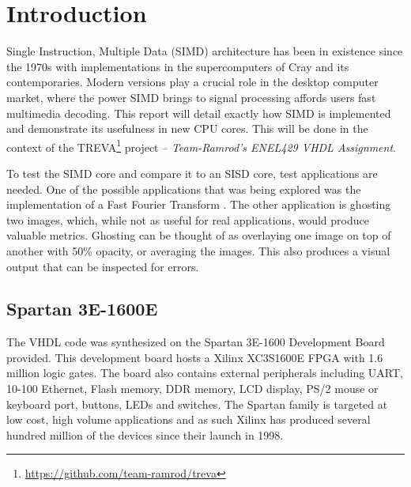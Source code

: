 \section{Introduction}

 Single Instruction, Multiple Data (SIMD) architecture has been in 
existence since the 1970s with implementations in the supercomputers of Cray 
and its contemporaries. Modern versions play a crucial role in the 
desktop computer market, where the power SIMD brings to signal
processing affords users fast multimedia decoding\cite{bonnot2008definition}. This
report will detail exactly how SIMD is implemented and demonstrate its usefulness
in new CPU cores.  This will be done in the context of the
TREVA\footnote{\url{https://github.com/team-ramrod/treva}} project --
\emph{Team-Ramrod's ENEL429 VHDL Assignment}.




To test the SIMD core  and compare it to an SISD core, test applications are
needed. One of the possible applications that was being explored was the
implementation of a Fast Fourier Transform \cite{Jamieson198648}. The other
application is ghosting two images, which, while not as useful for real applications, would
produce valuable metrics. Ghosting can be thought of as overlaying one image
on top of another with 50\% opacity, or averaging the images. This also produces a visual output
that can be inspected for errors.


\subsection{Spartan 3E-1600E}
The VHDL code was synthesized on the Spartan 3E-1600 Development Board
provided. This development board hosts a Xilinx XC3S1600E FPGA with 1.6 million
logic gates. The board also contains external peripherals
including UART, 10-100 Ethernet, Flash memory, DDR memory, LCD display, PS/2
mouse or keyboard port, buttons, LEDs and switches. The Spartan family is targeted
at low cost, high volume applications and as such Xilinx has produced several hundred million
of the devices\cite{xilinxpress} since their launch in 1998.




